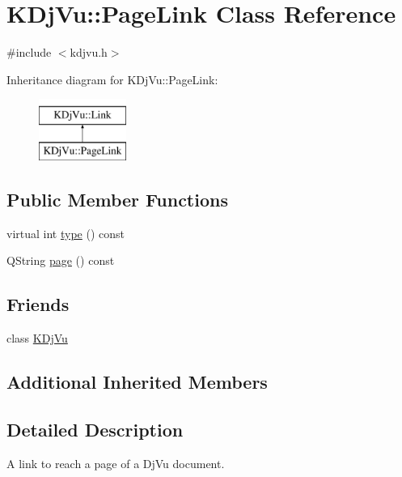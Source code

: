 \hypertarget{classKDjVu_1_1PageLink}{\section{K\+Dj\+Vu\+:\+:Page\+Link Class Reference}
\label{classKDjVu_1_1PageLink}
}


{\ttfamily \#include $<$kdjvu.\+h$>$}

Inheritance diagram for K\+Dj\+Vu\+:\+:Page\+Link\+:\begin{figure}[H]
\begin{center}
\leavevmode
\includegraphics[height=2.000000cm]{classKDjVu_1_1PageLink}
\end{center}
\end{figure}
\subsection*{Public Member Functions}
\begin{DoxyCompactItemize}
\item 
virtual int \hyperlink{classKDjVu_1_1PageLink_a3ed01b7b48403d996988b20038dc080f}{type} () const 
\item 
Q\+String \hyperlink{classKDjVu_1_1PageLink_afc757878fd0cfc214a82c1a5a2cca6e2}{page} () const 
\end{DoxyCompactItemize}
\subsection*{Friends}
\begin{DoxyCompactItemize}
\item 
class \hyperlink{classKDjVu_1_1PageLink_a4241ce0336d22245ffdb13dd5cb6edcc}{K\+Dj\+Vu}
\end{DoxyCompactItemize}
\subsection*{Additional Inherited Members}


\subsection{Detailed Description}
A link to reach a page of a Dj\+Vu document. 

